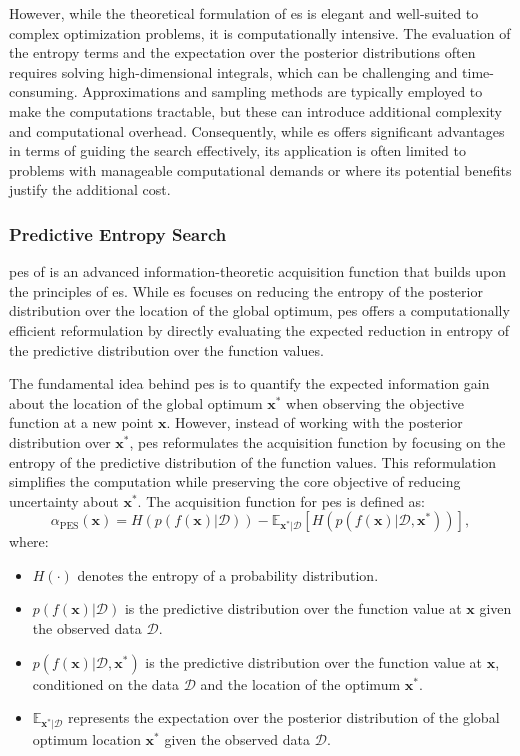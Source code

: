 However, while the theoretical formulation of \ac{es} is elegant and well-suited to complex optimization problems, it is computationally intensive. The evaluation of the entropy terms and the expectation over the posterior distributions often requires solving high-dimensional integrals, which can be challenging and time-consuming. Approximations and sampling methods are typically employed to make the computations tractable, but these can introduce additional complexity and computational overhead. Consequently, while \ac{es} offers significant advantages in terms of guiding the search effectively, its application is often limited to problems with manageable computational demands or where its potential benefits justify the additional cost.

\subsubsection{Predictive Entropy Search}
\acf{pes} of \citet{hernandez2014predictive} is an advanced information-theoretic acquisition function that builds upon the principles of \ac{es}. While \ac{es} focuses on reducing the entropy of the posterior distribution over the location of the global optimum, \ac{pes} offers a computationally efficient reformulation by directly evaluating the expected reduction in entropy of the predictive distribution over the function values.

The fundamental idea behind \ac{pes} is to quantify the expected information gain about the location of the global optimum $\mathbf{x}^*$ when observing the objective function at a new point $\mathbf{x}$. However, instead of working with the posterior distribution over $\mathbf{x}^*$, \ac{pes} reformulates the acquisition function by focusing on the entropy of the predictive distribution of the function values. This reformulation simplifies the computation while preserving the core objective of reducing uncertainty about $\mathbf{x}^*$. The acquisition function for \ac{pes} is defined as:
\begin{equation}
    \alpha_{\text{PES}}(\mathbf{x}) = H(p(f(\mathbf{x}) \vert \mathcal{D})) - \mathbb{E}_{\mathbf{x}^* \vert \mathcal{D}} \left[ H(p(f(\mathbf{x}) \vert \mathcal{D}, \mathbf{x}^*)) \right],
\end{equation}
where:
\begin{itemize}
    \item $H(\cdot)$ denotes the entropy of a probability distribution.
    \item $p(f(\mathbf{x}) \vert \mathcal{D})$ is the predictive distribution over the function value at $\mathbf{x}$ given the observed data $\mathcal{D}$.
    \item $p(f(\mathbf{x}) \vert \mathcal{D}, \mathbf{x}^*)$ is the predictive distribution over the function value at $\mathbf{x}$, conditioned on the data $\mathcal{D}$ and the location of the optimum $\mathbf{x}^*$.
    \item $\mathbb{E}_{\mathbf{x}^* \vert \mathcal{D}}$ represents the expectation over the posterior distribution of the global optimum location $\mathbf{x}^*$ given the observed data $\mathcal{D}$.
\end{itemize}


